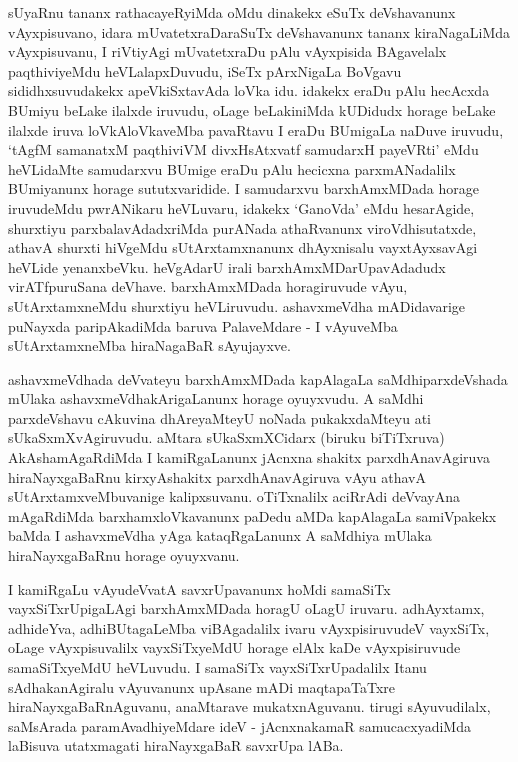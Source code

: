 \begin{artha}
sUyaRnu tananx rathacayeRyiMda oMdu dinakekx eSuTx deVshavanunx vAyxpisuvano, idara mUvatetxraDaraSuTx deVshavanunx tananx kiraNagaLiMda vAyxpisuvanu, I riVtiyAgi mUvatetxraDu pAlu vAyxpisida BAgavelalx paqthiviyeMdu heVLalapxDuvudu, iSeTx pArxNigaLa BoVgavu sididhxsuvudakekx apeVkiSxtavAda loVka idu. idakekx eraDu pAlu hecAcxda BUmiyu beLake ilalxde iruvudu, oLage beLakiniMda kUDidudx horage beLake ilalxde iruva loVkAloVkaveMba pavaRtavu I eraDu BUmigaLa naDuve iruvudu, `tAgfM samanatxM paqthiviVM divxHsAtxvatf samudarxH payeVRti' eMdu heVLidaMte samudarxvu BUmige eraDu pAlu hecicxna parxmANadalilx BUmiyanunx horage sututxvaridide. I samudarxvu barxhAmxMDada horage iruvudeMdu pwrANikaru heVLuvaru, idakekx `GanoVda' eMdu hesarAgide, shurxtiyu parxbalavAdadxriMda purANada athaRvanunx viroVdhisutatxde, athavA shurxti hiVgeMdu sUtArxtamxnanunx dhAyxnisalu vayxtAyxsavAgi heVLide yenanxbeVku. heVgAdarU irali barxhAmxMDarUpavAdadudx virATfpuruSana deVhave. barxhAmxMDada horagiruvude vAyu, sUtArxtamxneMdu shurxtiyu heVLiruvudu. ashavxmeVdha mADidavarige puNayxda paripAkadiMda baruva PalaveMdare - I vAyuveMba sUtArxtamxneMba hiraNagaBaR sAyujayxve.
\end{artha}

\begin{artha}
ashavxmeVdhada deVvateyu barxhAmxMDada kapAlagaLa saMdhiparxdeVshada mUlaka ashavxmeVdhakArigaLanunx horage oyuyxvudu. A saMdhi parxdeVshavu cAkuvina dhAreyaMteyU noNada pukakxdaMteyu ati sUkaSxmXvAgiruvudu. aMtara sUkaSxmXCidarx (biruku biTiTxruva) AkAshamAgaRdiMda I kamiRgaLanunx jAcnxna shakitx parxdhAnavAgiruva hiraNayxgaBaRnu kirxyAshakitx parxdhAnavAgiruva vAyu athavA sUtArxtamxveMbuvanige kalipxsuvanu. oTiTxnalilx aciRrAdi deVvayAna mAgaRdiMda barxhamxloVkavanunx paDedu aMDa kapAlagaLa samiVpakekx baMda I ashavxmeVdha yAga kataqRgaLanunx A saMdhiya mUlaka hiraNayxgaBaRnu horage oyuyxvanu. 
\end{artha}

\begin{artha}
I kamiRgaLu vAyudeVvatA savxrUpavanunx hoMdi samaSiTx vayxSiTxrUpigaLAgi barxhAmxMDada horagU oLagU iruvaru. adhAyxtamx, adhideYva, adhiBUtagaLeMba viBAgadalilx ivaru vAyxpisiruvudeV vayxSiTx, oLage vAyxpisuvalilx vayxSiTxyeMdU horage elAlx kaDe vAyxpisiruvude samaSiTxyeMdU heVLuvudu. I samaSiTx vayxSiTxrUpadalilx Itanu sAdhakanAgiralu vAyuvanunx upAsane mADi maqtapaTaTxre hiraNayxgaBaRnAguvanu, anaMtarave mukatxnAguvanu. tirugi sAyuvudilalx, saMsArada paramAvadhiyeMdare ideV - jAcnxnakamaR samucacxyadiMda laBisuva utatxmagati hiraNayxgaBaR savxrUpa lABa.
\end{artha}

